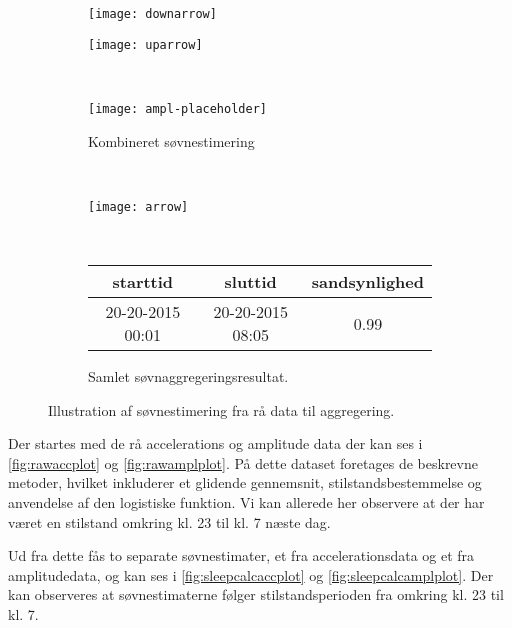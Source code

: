 \begin{figure}
\begin{minipage}{\linewidth}
		\begin{subfigure}{0.5\linewidth}
			\centering
			\texttt{[image: downarrow]}
		\end{subfigure}
		\begin{subfigure}{0.5\linewidth}
			\centering
			\texttt{[image: uparrow]}
		\end{subfigure}
	\end{minipage}\\[1ex]%
	\begin{minipage}{\linewidth}
		\begin{subfigure}{\linewidth}
			\centering
			\texttt{[image: ampl-placeholder]}
			\caption{Kombineret søvnestimering}\label{fig:sleepcalcombine}
		\end{subfigure}
	\end{minipage}\\[1ex]%
	\begin{minipage}{\linewidth}
		\begin{subfigure}{\linewidth}
			\centering
			\texttt{[image: arrow]}
		\end{subfigure}
	\end{minipage}\\[1ex]%
	\begin{minipage}{\linewidth}
		\begin{subfigure}{\linewidth}
			\centering
			\begin{tabular}{|c|c|c|}
			\hline starttid & sluttid & sandsynlighed \\ 
			\hline 20-20-2015 00:01 & 20-20-2015 08:05 & 0.99 \\ 
			\hline 
			\end{tabular}
			\caption{Samlet søvnaggregeringsresultat.}\label{fig:finalagg}
		\end{subfigure}
	\end{minipage}
	\caption{Illustration af søvnestimering fra rå data til aggregering.}\label{fig:totalbanjo}
\end{figure}

Der startes med de rå accelerations og amplitude data der kan ses i \cref{fig:rawaccplot} og \cref{fig:rawamplplot}.
På dette dataset foretages de beskrevne metoder, hvilket inkluderer et glidende gennemsnit, stilstandsbestemmelse og anvendelse af den logistiske funktion.
Vi kan allerede her observere at der har været en stilstand omkring kl. 23 til kl. 7 næste dag.

Ud fra dette fås to separate søvnestimater, et fra accelerationsdata og et fra amplitudedata, og kan ses i \cref{fig:sleepcalcaccplot} og \cref{fig:sleepcalcamplplot}. Der kan observeres at søvnestimaterne følger stilstandsperioden fra omkring kl. 23 til kl. 7.

